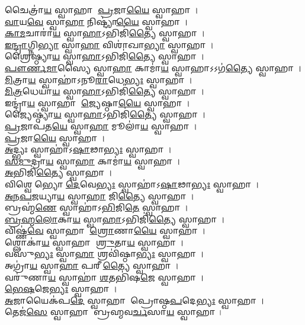 𑌚𑍈𑌤𑍍𑌰𑌾॑\ul{𑌯} 𑌸𑍍𑌵𑌾𑌹𑌾 \ul{𑌪𑍍𑌰}𑌜𑌾\ul{𑌯𑍈} 𑌸𑍍𑌵𑌾𑌹𑌾।\\
\ul{𑌵𑌾}𑌯\ul{𑌵𑍇} 𑌸𑍍𑌵𑌾\ul{𑌹𑌾} 𑌨𑌿𑌷𑍍𑌟𑍍𑌯𑌾॑\ul{𑌯𑍈} 𑌸𑍍𑌵𑌾𑌹𑌾।\\
\ul{𑌕𑌾}\ul{𑌮}𑌚𑌾𑌰𑌾॑\ul{𑌯} 𑌸𑍍𑌵𑌾\ul{𑌹𑌾}𑌽𑌭𑌿𑌜𑌿॑\ul{𑌤𑍍𑌯𑍈} 𑌸𑍍𑌵𑌾𑌹𑌾।\\
\ul{𑌇}\ul{𑌨𑍍𑌦𑍍𑌰𑌾}𑌗𑍍𑌨𑌿\ul{𑌭𑍍𑌯𑌾}\ul{} 𑌸𑍍𑌵𑌾\ul{𑌹𑌾} 𑌵𑌿𑌶𑌾॑𑌖𑌾\ul{𑌭𑍍𑌯𑌾}\ul{} 𑌸𑍍𑌵𑌾𑌹𑌾।\\
𑌶𑍍𑌰𑍈𑌷𑍍𑌠𑍍𑌯𑌾\ul{𑌯} 𑌸𑍍𑌵𑌾\ul{𑌹𑌾}𑌽𑌭𑌿𑌜𑌿॑\ul{𑌤𑍍𑌯𑍈} 𑌸𑍍𑌵𑌾𑌹𑌾।\\
\ul{𑌪𑍗}\ul{𑌰𑍍𑌣}\ul{𑌮𑌾}𑌸𑍍𑌯𑍈 𑌸𑍍𑌵𑌾\ul{𑌹𑌾} 𑌕𑌾𑌮𑌾॑\ul{𑌯} 𑌸𑍍𑌵𑌾𑌹𑌾𑌽𑌽𑌗॑\ul{𑌤𑍍𑌯𑍈} 𑌸𑍍𑌵𑌾𑌹𑌾।\\
\ul{𑌮𑌿}𑌤𑍍𑌰𑌾\ul{𑌯} 𑌸𑍍𑌵𑌾𑌹𑌾॑𑌽𑌨𑍂\ul{𑌰𑌾}𑌧𑍇\ul{𑌭𑍍𑌯𑌃} 𑌸𑍍𑌵𑌾𑌹𑌾।\\
\ul{𑌮𑌿}\ul{𑌤𑍍𑌰}𑌧𑍇𑌯𑌾॑\ul{𑌯} 𑌸𑍍𑌵𑌾\ul{𑌹𑌾}𑌽𑌭𑌿𑌜𑌿॑\ul{𑌤𑍍𑌯𑍈} 𑌸𑍍𑌵𑌾𑌹𑌾।\\
𑌇𑌨𑍍𑌦𑍍𑌰𑌾॑\ul{𑌯} 𑌸𑍍𑌵𑌾𑌹𑌾 \ul{𑌜𑍍𑌯𑍇}𑌷𑍍𑌠𑌾\ul{𑌯𑍈} 𑌸𑍍𑌵𑌾𑌹𑌾।\\
𑌜𑍍𑌯𑍈𑌷𑍍𑌠𑍍𑌯𑌾॑\ul{𑌯} 𑌸𑍍𑌵𑌾\ul{𑌹𑌾}𑌽𑌭𑌿𑌜𑌿॑\ul{𑌤𑍍𑌯𑍈} 𑌸𑍍𑌵𑌾𑌹𑌾।\\
\ul{𑌪𑍍𑌰}𑌜𑌾𑌪॑𑌤\ul{𑌯𑍇} 𑌸𑍍𑌵𑌾\ul{𑌹𑌾} 𑌮𑍂𑌲𑌾॑\ul{𑌯} 𑌸𑍍𑌵𑌾𑌹𑌾।\\
\ul{𑌪𑍍𑌰}𑌜𑌾\ul{𑌯𑍈} 𑌸𑍍𑌵𑌾𑌹𑌾।\\
\ul{𑌅}𑌦𑍍𑌭𑍍𑌯𑌃 𑌸𑍍𑌵𑌾𑌹𑌾॑𑌽\ul{𑌷𑌾}𑌢𑌾\ul{𑌭𑍍𑌯𑌃} 𑌸𑍍𑌵𑌾𑌹𑌾।\\
\ul{𑌸}\ul{𑌮𑍁}𑌦𑍍𑌰𑌾\ul{𑌯} 𑌸𑍍𑌵𑌾\ul{𑌹𑌾} 𑌕𑌾𑌮𑌾॑\ul{𑌯} 𑌸𑍍𑌵𑌾𑌹𑌾।\\
\ul{𑌅}𑌭𑌿𑌜𑌿॑\ul{𑌤𑍍𑌯𑍈} 𑌸𑍍𑌵𑌾𑌹𑌾।\\
𑌵𑌿𑌶𑍍𑌵𑍇𑌭𑍍𑌯𑍋 \ul{𑌦𑍇}𑌵𑍇\ul{𑌭𑍍𑌯𑌃} 𑌸𑍍𑌵𑌾𑌹𑌾॑𑌽\ul{𑌷𑌾}𑌢𑌾\ul{𑌭𑍍𑌯𑌃} 𑌸𑍍𑌵𑌾𑌹𑌾।\\
\ul{𑌅}\ul{𑌨}\ul{𑌪}\ul{𑌜}𑌯𑍍𑌯𑌾\ul{𑌯} 𑌸𑍍𑌵𑌾\ul{𑌹𑌾} 𑌜𑌿\ul{𑌤𑍍𑌯𑍈} 𑌸𑍍𑌵𑌾𑌹𑌾।\\
𑌬𑍍𑌰𑌹𑍍𑌮॑\ul{𑌣𑍇} 𑌸𑍍𑌵𑌾𑌹𑌾॑𑌽\ul{𑌭𑌿}𑌜𑌿\ul{𑌤𑍇} 𑌸𑍍𑌵𑌾𑌹𑌾।\\
\ul{𑌬𑍍𑌰}\ul{𑌹𑍍𑌮}\ul{𑌲𑍋}𑌕𑌾\ul{𑌯} 𑌸𑍍𑌵𑌾\ul{𑌹𑌾}𑌽𑌭𑌿𑌜𑌿॑\ul{𑌤𑍍𑌯𑍈} 𑌸𑍍𑌵𑌾𑌹𑌾।\\
𑌵𑌿𑌷𑍍𑌣॑\ul{𑌵𑍇} 𑌸𑍍𑌵𑌾𑌹𑌾 \ul{𑌶𑍍𑌰𑍋}𑌣𑌾\ul{𑌯𑍈} 𑌸𑍍𑌵𑌾𑌹𑌾।\\
𑌶𑍍𑌲𑍋𑌕𑌾॑\ul{𑌯} 𑌸𑍍𑌵𑌾𑌹𑌾 \ul{𑌶𑍍𑌰𑍁}𑌤𑌾\ul{𑌯} 𑌸𑍍𑌵𑌾𑌹𑌾।\\
𑌵𑌸𑍁॑\ul{𑌭𑍍𑌯𑌃} 𑌸𑍍𑌵𑌾\ul{𑌹𑌾} 𑌶𑍍𑌰𑌵𑌿॑𑌷𑍍𑌠𑌾\ul{𑌭𑍍𑌯𑌃} 𑌸𑍍𑌵𑌾𑌹𑌾।\\
𑌅𑌗𑍍𑌰𑌾॑\ul{𑌯} 𑌸𑍍𑌵𑌾\ul{𑌹𑌾} 𑌪𑌰𑍀\ul{𑌤𑍍𑌯𑍈} 𑌸𑍍𑌵𑌾𑌹𑌾।\\
𑌵𑌰𑍁॑𑌣𑌾\ul{𑌯} 𑌸𑍍𑌵𑌾𑌹𑌾॑ \ul{𑌶}𑌤𑌭𑌿॑𑌷\ul{𑌜𑍇} 𑌸𑍍𑌵𑌾𑌹𑌾।\\
\ul{𑌭𑍇}\ul{𑌷}𑌜𑍇\ul{𑌭𑍍𑌯𑌃} 𑌸𑍍𑌵𑌾𑌹𑌾।\\
\ul{𑌅}𑌜𑌾𑌯𑍈𑌕॑𑌪\ul{𑌦𑍇} 𑌸𑍍𑌵𑌾𑌹𑌾 𑌪𑍍𑌰𑍋𑌷𑍍𑌠\ul{𑌪}𑌦𑍇\ul{𑌭𑍍𑌯𑌃} 𑌸𑍍𑌵𑌾𑌹𑌾।\\
𑌤𑍇𑌜॑\ul{𑌸𑍇} 𑌸𑍍𑌵𑌾𑌹𑌾 𑌬𑍍𑌰𑌹𑍍𑌮𑌵\ul{𑌰𑍍𑌚}𑌸𑌾\ul{𑌯} 𑌸𑍍𑌵𑌾𑌹𑌾।\\
